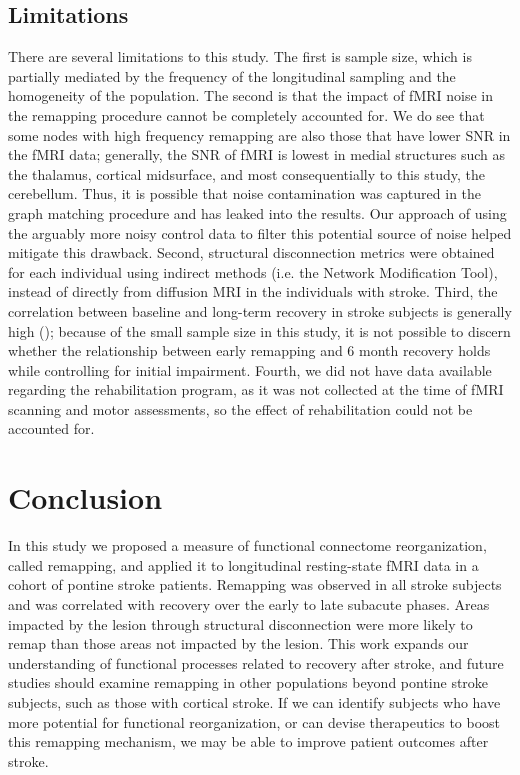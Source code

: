 \documentclass[phd,tocprelim]{cornell}
\begin{document}
	\subsection{Limitations}
	There are several limitations to this study. The first is sample size, which is partially mediated by the frequency of the longitudinal sampling and the homogeneity of the population. The second is that the impact of fMRI noise in the remapping procedure cannot be completely accounted for. We do see that some nodes with high frequency remapping are also those that have lower SNR in the fMRI data; generally, the SNR of fMRI is lowest in medial structures such as the thalamus, cortical midsurface, and most consequentially to this study, the cerebellum. Thus, it is possible that noise contamination was captured in the graph matching procedure and has leaked into the results. Our approach of using the arguably more noisy control data to filter this potential source of noise helped mitigate this drawback. Second, structural disconnection metrics were obtained for each individual using indirect methods (i.e. the Network Modification Tool), instead of directly from diffusion MRI in the individuals with stroke. Third, the correlation between baseline and long-term recovery in stroke subjects is generally high (\cite{Krakauer2015-sy}); because of the small sample size in this study, it is not possible to discern whether the relationship between early remapping and 6 month recovery holds while controlling for initial impairment. Fourth, we did not have data available regarding the rehabilitation program, as it was not collected at the time of fMRI scanning and motor assessments, so the effect of rehabilitation could not be accounted for. 

\section{Conclusion}
	In this study we proposed a measure of functional connectome reorganization, called remapping, and applied it to longitudinal resting-state fMRI data in a cohort of pontine stroke patients. Remapping was observed in all stroke subjects and was correlated with recovery over the early to late subacute phases. Areas impacted by the lesion through structural disconnection were more likely to remap than those areas not impacted by the lesion. This work expands our understanding of functional processes related to recovery after stroke, and future studies should examine remapping in other populations beyond pontine stroke subjects, such as those with cortical stroke. If we can identify subjects who have more potential for functional reorganization, or can devise therapeutics to boost this remapping mechanism, we may be able to improve patient outcomes after stroke.
	
\end{document}
